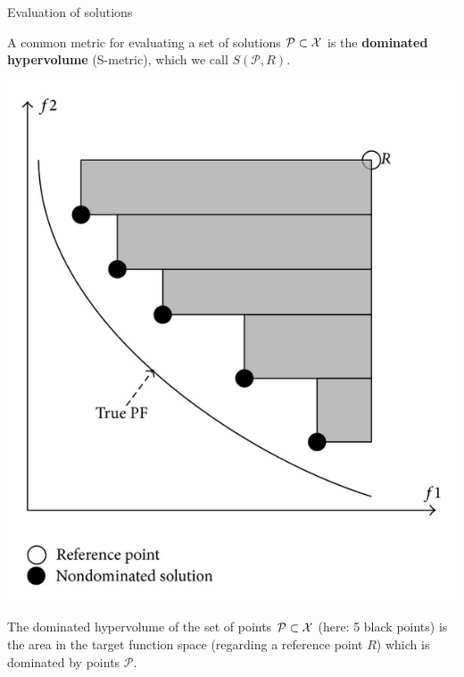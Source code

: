 \begin{frame}{Evaluation of solutions}

A common metric for evaluating a set of solutions $\mathcal{P} \subset \mathcal{X}$ is the \textbf{dominated hypervolume} (S-metric), which we call $S(\mathcal{P}, R)$.

\vspace*{-0.4cm}

\begin{center}
\includegraphics[width = 0.3\linewidth]{images/dominated_hypervolume.png}
\end{center}

\vspace*{-0.4cm}

The dominated hypervolume of the set of points $\mathcal{P} \subset \mathcal{X}$ (here: 5 black points) is the area in the target function space (regarding a reference point $R$) which is dominated by points $\mathcal{P}$.

\end{frame}


